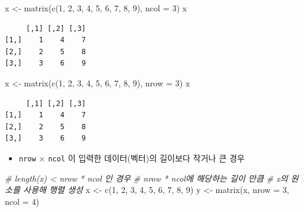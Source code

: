\documentclass[
  11pt,
]{krantz}
\newenvironment{Shaded}{\begin{snugshade}}{\end{snugshade}}
\newcommand{\AttributeTok}[1]{\textcolor[rgb]{0.61,0.61,0.61}{#1}}
\newcommand{\CommentTok}[1]{\textcolor[rgb]{0.37,0.37,0.37}{\textit{#1}}}
\newcommand{\DecValTok}[1]{\textcolor[rgb]{0.06,0.06,0.06}{#1}}
\newcommand{\FunctionTok}[1]{\textcolor[rgb]{0,0,0}{#1}}
\newcommand{\NormalTok}[1]{#1}
\newcommand{\OtherTok}[1]{\textcolor[rgb]{0.37,0.37,0.37}{#1}}
\providecommand{\tightlist}{%
  \setlength{\itemsep}{0pt}\setlength{\parskip}{0pt}}
\begin{document}
\footnotesize

\begin{Shaded}
\begin{Highlighting}[]
\NormalTok{x }\OtherTok{\textless{}{-}} \FunctionTok{matrix}\NormalTok{(}\FunctionTok{c}\NormalTok{(}\DecValTok{1}\NormalTok{, }\DecValTok{2}\NormalTok{, }\DecValTok{3}\NormalTok{, }\DecValTok{4}\NormalTok{, }\DecValTok{5}\NormalTok{, }\DecValTok{6}\NormalTok{, }\DecValTok{7}\NormalTok{, }\DecValTok{8}\NormalTok{, }\DecValTok{9}\NormalTok{), }\AttributeTok{ncol =} \DecValTok{3}\NormalTok{)}
\NormalTok{x}
\end{Highlighting}
\end{Shaded}

\begin{verbatim}
     [,1] [,2] [,3]
[1,]    1    4    7
[2,]    2    5    8
[3,]    3    6    9
\end{verbatim}

\begin{Shaded}
\begin{Highlighting}[]
\NormalTok{x }\OtherTok{\textless{}{-}} \FunctionTok{matrix}\NormalTok{(}\FunctionTok{c}\NormalTok{(}\DecValTok{1}\NormalTok{, }\DecValTok{2}\NormalTok{, }\DecValTok{3}\NormalTok{, }\DecValTok{4}\NormalTok{, }\DecValTok{5}\NormalTok{, }\DecValTok{6}\NormalTok{, }\DecValTok{7}\NormalTok{, }\DecValTok{8}\NormalTok{, }\DecValTok{9}\NormalTok{), }\AttributeTok{nrow =} \DecValTok{3}\NormalTok{)}
\NormalTok{x}
\end{Highlighting}
\end{Shaded}

\begin{verbatim}
     [,1] [,2] [,3]
[1,]    1    4    7
[2,]    2    5    8
[3,]    3    6    9
\end{verbatim}

\normalsize

\begin{itemize}
\tightlist
\item
  \texttt{nrow} \(\times\) \texttt{ncol} 이 입력한 데이터(벡터)의 길이보다 작거나 큰 경우
\end{itemize}

\footnotesize

\begin{Shaded}
\begin{Highlighting}[]
\CommentTok{\# length(x) \textless{} nrow * ncol 인 경우 }
\CommentTok{\# nrow * ncol에 해당하는 길이 만큼}
\CommentTok{\# x의 원소를 사용해 행렬 생성}
\NormalTok{x }\OtherTok{\textless{}{-}} \FunctionTok{c}\NormalTok{(}\DecValTok{1}\NormalTok{, }\DecValTok{2}\NormalTok{, }\DecValTok{3}\NormalTok{, }\DecValTok{4}\NormalTok{, }\DecValTok{5}\NormalTok{, }\DecValTok{6}\NormalTok{, }\DecValTok{7}\NormalTok{, }\DecValTok{8}\NormalTok{, }\DecValTok{9}\NormalTok{)}
\NormalTok{y }\OtherTok{\textless{}{-}} \FunctionTok{matrix}\NormalTok{(x, }\AttributeTok{nrow =} \DecValTok{3}\NormalTok{, }\AttributeTok{ncol =} \DecValTok{4}\NormalTok{)}
\end{Highlighting}
\end{Shaded}
\end{document}
